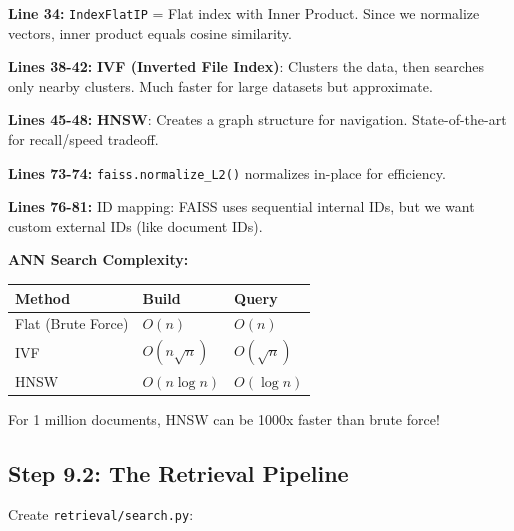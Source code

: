 \documentclass[12pt,a4paper]{article}
\begin{document}
\begin{explanation}
\textbf{Line 34:} \texttt{IndexFlatIP} = Flat index with Inner Product. Since we normalize vectors, inner product equals cosine similarity.

\textbf{Lines 38-42:} \textbf{IVF (Inverted File Index)}: Clusters the data, then searches only nearby clusters. Much faster for large datasets but approximate.

\textbf{Lines 45-48:} \textbf{HNSW}: Creates a graph structure for navigation. State-of-the-art for recall/speed tradeoff.

\textbf{Lines 73-74:} \texttt{faiss.normalize\_L2()} normalizes in-place for efficiency.

\textbf{Lines 76-81:} ID mapping: FAISS uses sequential internal IDs, but we want custom external IDs (like document IDs).
\end{explanation}

\begin{mathbox}
\textbf{ANN Search Complexity:}

\begin{tabular}{|l|l|l|}
\hline
\textbf{Method} & \textbf{Build} & \textbf{Query} \\
\hline
Flat (Brute Force) & $O(n)$ & $O(n)$ \\
IVF & $O(n\sqrt{n})$ & $O(\sqrt{n})$ \\
HNSW & $O(n\log n)$ & $O(\log n)$ \\
\hline
\end{tabular}

For 1 million documents, HNSW can be 1000x faster than brute force!
\end{mathbox}

\subsection{Step 9.2: The Retrieval Pipeline}

Create \texttt{retrieval/search.py}:
\end{document}
